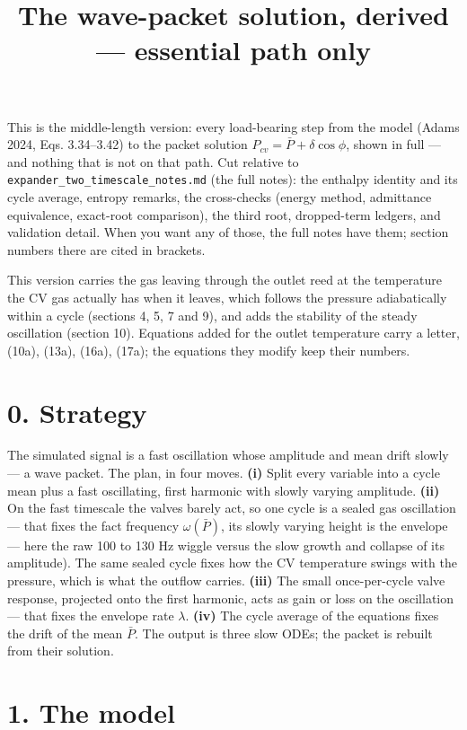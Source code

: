 \documentclass[11pt]{article}
\title{The wave-packet solution, derived --- essential path only}
\author{}
\date{}
\begin{document}
\maketitle
This is the middle-length version: every load-bearing step from the model (Adams 2024, Eqs. 3.34--3.42) to the packet solution $P_{cv} = \bar P + \delta\cos\phi$, shown in full --- and nothing that is not on that path. Cut relative to \texttt{expander\_two\_timescale\_notes.md} (the full notes): the enthalpy identity and its cycle average, entropy remarks, the cross-checks (energy method, admittance equivalence, exact-root comparison), the third root, dropped-term ledgers, and validation detail. When you want any of those, the full notes have them; section numbers there are cited in brackets.

This version carries the gas leaving through the outlet reed at the temperature the CV gas actually has when it leaves, which follows the pressure adiabatically within a cycle (sections 4, 5, 7 and 9), and adds the stability of the steady oscillation (section 10). Equations added for the outlet temperature carry a letter, (10a), (13a), (16a), (17a); the equations they modify keep their numbers.

\section*{0. Strategy}

The simulated signal is a fast oscillation whose amplitude and mean drift slowly --- a wave packet. The plan, in four moves. \textbf{(i)} Split every variable into a cycle mean plus a fast oscillating, first harmonic with slowly varying amplitude. \textbf{(ii)} On the fast timescale the valves barely act, so one cycle is a sealed gas oscillation --- that fixes the fact frequency $\omega(\bar P)$, its slowly varying height is the envelope --- here the raw 100 to 130 Hz wiggle versus the slow growth and collapse of its amplitude). The same sealed cycle fixes how the CV temperature swings with the pressure, which is what the outflow carries. \textbf{(iii)} The small once-per-cycle valve response, projected onto the first harmonic, acts as gain or loss on the oscillation --- that fixes the envelope rate $\lambda$. \textbf{(iv)} The cycle average of the equations fixes the drift of the mean $\bar P$. The output is three slow ODEs; the packet is rebuilt from their solution.

\section*{1. The model}
\end{document}
